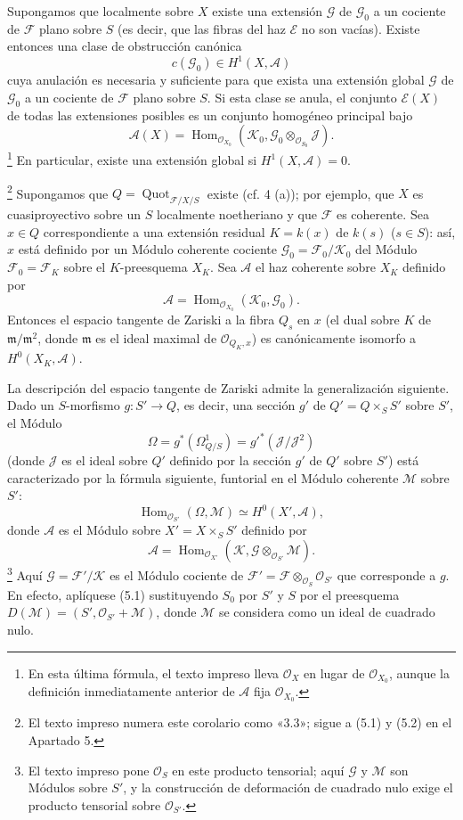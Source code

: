  Supongamos que localmente sobre $X$ existe una
extensión $\mathcal G$ de $\mathcal G_0$ a un cociente de $\mathcal F$ plano
sobre $S$ (es decir, que las fibras del haz $\mathcal E$ no son vacías).
Existe entonces una clase de obstrucción canónica
\[
c(\mathcal G_0)\in H^1(X,\mathcal A)
\]
cuya anulación es necesaria y suficiente para que exista una extensión global
$\mathcal G$ de $\mathcal G_0$ a un cociente de $\mathcal F$ plano sobre $S$.
Si esta clase se anula, el conjunto $\mathcal E(X)$ de todas las extensiones
posibles es un conjunto homogéneo principal bajo
\[
\mathcal A(X)=\operatorname{Hom}_{\mathcal O_{X_0}}
(\mathcal K_0,\mathcal G_0\otimes_{\mathcal O_{S_0}}\mathcal J).
\]
\footnote{En esta última fórmula, el texto impreso lleva $\mathcal O_X$ en
lugar de $\mathcal O_{X_0}$, aunque la definición inmediatamente anterior de
$\mathcal A$ fija $\mathcal O_{X_0}$.}
En particular, existe una extensión global si $H^1(X,\mathcal A)=0$.

\footnote{El texto impreso numera este corolario como
«3.3»; sigue a (5.1) y (5.2) en el Apartado 5.} Supongamos que
$Q=\operatorname{Quot}_{\mathcal F/X/S}$ existe (cf. 4 (a)); por ejemplo, que
$X$ es cuasiproyectivo sobre un $S$ localmente noetheriano y que $\mathcal F$
es coherente. Sea $x\in Q$ correspondiente a una extensión residual
$K=k(x)$ de $k(s)$ ($s\in S$):
así, $x$ está definido por un Módulo coherente cociente
$\mathcal G_0=\mathcal F_0/\mathcal K_0$ del Módulo
$\mathcal F_0=\mathcal F_K$ sobre el $K$-preesquema $X_K$. Sea $\mathcal A$
el haz coherente sobre $X_K$ definido por
\[
\mathcal A=\operatorname{Hom}_{\mathcal O_{X_0}}(\mathcal K_0,\mathcal G_0).
\]
Entonces el espacio tangente de Zariski a la fibra $Q_s$ en $x$ (el dual
sobre $K$ de $\mathfrak m/\mathfrak m^2$, donde $\mathfrak m$ es el ideal
maximal de $\mathcal O_{Q_K,x}$) es canónicamente isomorfo a
$H^0(X_K,\mathcal A)$.

La descripción del espacio tangente de Zariski admite la generalización
siguiente. Dado un $S$-morfismo $g:S'\longrightarrow Q$, es decir, una sección
$g'$ de $Q'=Q\times_SS'$ sobre $S'$, el Módulo
\[
\Omega=g^*(\Omega^1_{Q/S})=g'^*(\mathcal J/\mathcal J^2)
\]
(donde $\mathcal J$ es el ideal sobre $Q'$ definido por la sección $g'$ de
$Q'$ sobre $S'$) está caracterizado por la fórmula siguiente, funtorial en el
Módulo coherente $\mathcal M$ sobre $S'$:
\[
\operatorname{Hom}_{\mathcal O_{S'}}(\Omega,\mathcal M)
\simeq H^0(X',\mathcal A),
\]
donde $\mathcal A$ es el Módulo sobre $X'=X\times_SS'$ definido por
\[
\mathcal A=\operatorname{Hom}_{\mathcal O_{X'}}
(\mathcal K,\mathcal G\otimes_{\mathcal O_{S'}}\mathcal M).
\]
\footnote{El texto impreso pone $\mathcal O_S$ en este producto tensorial;
aquí $\mathcal G$ y $\mathcal M$ son Módulos sobre $S'$, y la construcción de
deformación de cuadrado nulo exige el producto tensorial sobre
$\mathcal O_{S'}$.}
Aquí $\mathcal G=\mathcal F'/\mathcal K$ es el Módulo cociente de
$\mathcal F'=\mathcal F\otimes_{\mathcal O_S}\mathcal O_{S'}$ que corresponde
a $g$. En efecto, aplíquese (5.1) sustituyendo $S_0$ por $S'$ y $S$ por el
preesquema $D(\mathcal M)=(S',\mathcal O_{S'}+\mathcal M)$, donde
$\mathcal M$ se considera como un ideal de cuadrado nulo.

